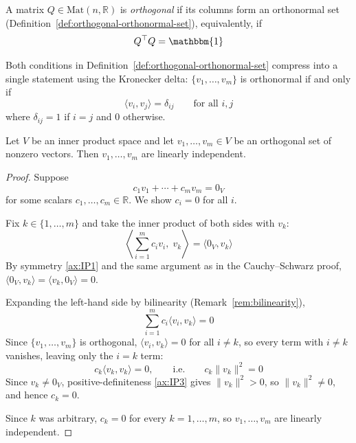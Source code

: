 		\begin{definition}
			\label{def:orthogonal-matrix}
			A matrix $Q \in \mathrm{Mat}(n,\mathbb{R})$ is \emph{orthogonal} if its columns form an orthonormal set (Definition~\ref{def:orthogonal-orthonormal-set}), equivalently, if
			\[
			Q^\top Q = \mathbbm{1}
			\]
		\end{definition}
		
		\begin{remark}
			Both conditions in Definition~\ref{def:orthogonal-orthonormal-set} compress into a single statement using the Kronecker delta: $\{v_1,\dots,v_m\}$ is orthonormal if and only if
			\[
				\langle v_i, v_j \rangle = \delta_{ij} \qquad \text{for all } i,j
			\]
			where $\delta_{ij} = 1$ if $i=j$ and $0$ otherwise.
		\end{remark}
		
		\begin{proposition}
			\label{prop:orthogonal-and-linearly-independent}
			Let $V$ be an inner product space and let $v_1, \dots, v_m \in V$ be an orthogonal set of nonzero vectors. Then $v_1, \dots, v_m$ are linearly independent.
		\end{proposition}
		
		\begin{proof}
			Suppose
			\[
				c_1 v_1 + \cdots + c_m v_m = 0_V
			\]
			for some scalars $c_1,\dots,c_m \in \mathbb{R}$. We show $c_i = 0$ for all $i$.
			
			Fix $k \in \{1,\dots,m\}$ and take the inner product of both sides with $v_k$:
			\[
				\left\langle \sum_{i=1}^{m} c_i v_i,\; v_k \right\rangle = \langle 0_V, v_k \rangle
			\]
			By symmetry \ref{ax:IP1} and the same argument as in the Cauchy–Schwarz proof, $\langle 0_V, v_k \rangle = \langle v_k, 0_V \rangle = 0$.
			
			Expanding the left-hand side by bilinearity (Remark~\ref{rem:bilinearity}),
			\[
				\sum_{i=1}^{m} c_i \langle v_i, v_k \rangle = 0
			\]
			Since $\{v_1,\dots,v_m\}$ is orthogonal, $\langle v_i, v_k\rangle = 0$ for all $i \neq k$, so every term with $i\neq k$ vanishes, leaving only the $i=k$ term:
			\[
				c_k \langle v_k, v_k \rangle = 0, \qquad \text{i.e.} \qquad c_k \|v_k\|^2 = 0
			\]
			Since $v_k \neq 0_V$, positive-definiteness \ref{ax:IP3} gives $\|v_k\|^2 > 0$, so $\|v_k\|^2 \neq 0$, and hence $c_k = 0$.
			
			Since $k$ was arbitrary, $c_k = 0$ for every $k=1,\dots,m$, so $v_1,\dots,v_m$ are linearly independent.
		\end{proof}
		
